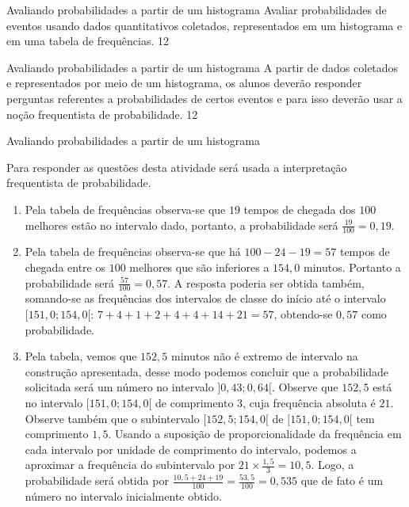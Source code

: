 \begin{objectives}{Avaliando probabilidades a partir de um histograma}
{
Avaliar probabilidades de eventos usando dados quantitativos coletados, representados em um histograma e em uma tabela de frequências.
}{1}{2}
\end{objectives}
\begin{sugestions}{Avaliando probabilidades a partir de um histograma}
{
A partir de dados coletados e representados por meio de um histograma, os alunos deverão responder perguntas referentes a probabilidades de certos eventos e para isso deverão usar a noção frequentista de probabilidade.
}{1}{2}
\end{sugestions}
\clearmargin

\begin{answer}{Avaliando probabilidades a partir de um histograma}
{
Para responder as questões desta atividade será usada a interpretação frequentista de probabilidade.

\begin{enumerate}
\item Pela tabela de frequências observa-se que $19$ tempos de chegada dos $100$ melhores estão no intervalo dado, portanto, a probabilidade será $\frac{19}{100}=0{,}19$.

\item Pela tabela de frequências observa-se que há $100−24−19=57$ tempos de chegada entre os $100$ melhores que são inferiores a $154{,}0$ minutos. Portanto a probabilidade será $\frac{57}{100}=0{,}57$. A resposta poderia ser obtida também, somando-se as frequências dos intervalos de classe do início até o intervalo $[151{,}0 ; 154{,}0[$: $7+4+1+2+4+4+14+21=57$, obtendo-se $0{,}57$ como probabilidade.

\item Pela tabela, vemos que $152{,}5$ minutos não é extremo de intervalo na construção apresentada, desse modo podemos concluir que a probabilidade solicitada será um número no intervalo $]0{,}43 ; 0{,}64[$. Observe que $152{,}5$ está no intervalo $[151{,}0 ; 154{,}0[$ de comprimento 3, cuja frequência absoluta é $21$. Observe também que o subintervalo $[152{,}5; 154{,}0[$ de $[151{,}0 ; 154{,}0[$ tem comprimento $1{,}5$. Usando a suposição de proporcionalidade da frequência em cada intervalo por unidade de comprimento do intervalo, podemos a aproximar a frequência do subintervalo por $21\times\frac{1{,}5}{3}=10{,}5$. Logo, a probabilidade será obtida por $\frac{10{,}5+24+19}{100}=\frac{53{,}5}{100}=0{,}535$ que de fato é um número no intervalo inicialmente obtido.


\end{enumerate}}
\end{answer}
